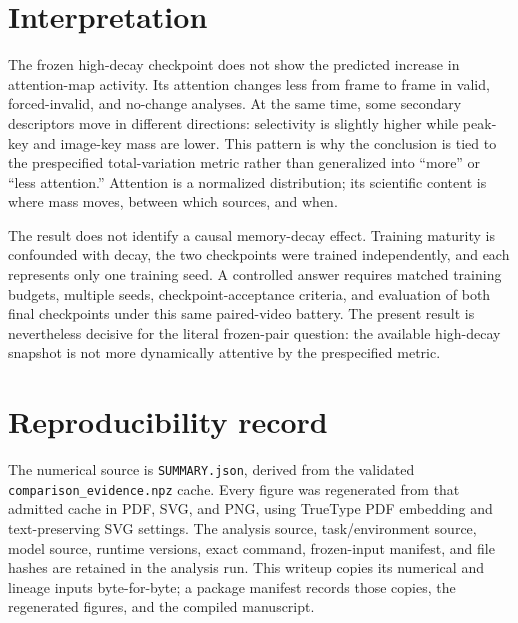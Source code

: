 \documentclass[11pt]{article}
\begin{document}
\section{Interpretation}
The frozen high-decay checkpoint does not show the predicted increase in attention-map activity. Its attention changes less from frame to frame in valid, forced-invalid, and no-change analyses. At the same time, some secondary descriptors move in different directions: selectivity is slightly higher while peak-key and image-key mass are lower. This pattern is why the conclusion is tied to the prespecified total-variation metric rather than generalized into ``more'' or ``less attention.'' Attention is a normalized distribution; its scientific content is where mass moves, between which sources, and when.

The result does not identify a causal memory-decay effect. Training maturity is confounded with decay, the two checkpoints were trained independently, and each represents only one training seed. A controlled answer requires matched training budgets, multiple seeds, checkpoint-acceptance criteria, and evaluation of both final checkpoints under this same paired-video battery. The present result is nevertheless decisive for the literal frozen-pair question: the available high-decay snapshot is not more dynamically attentive by the prespecified metric.

\section{Reproducibility record}
The numerical source is \texttt{SUMMARY.json}, derived from the validated \texttt{comparison\_evidence.npz} cache. Every figure was regenerated from that admitted cache in PDF, SVG, and PNG, using TrueType PDF embedding and text-preserving SVG settings. The analysis source, task/environment source, model source, runtime versions, exact command, frozen-input manifest, and file hashes are retained in the analysis run. This writeup copies its numerical and lineage inputs byte-for-byte; a package manifest records those copies, the regenerated figures, and the compiled manuscript.
\end{document}

